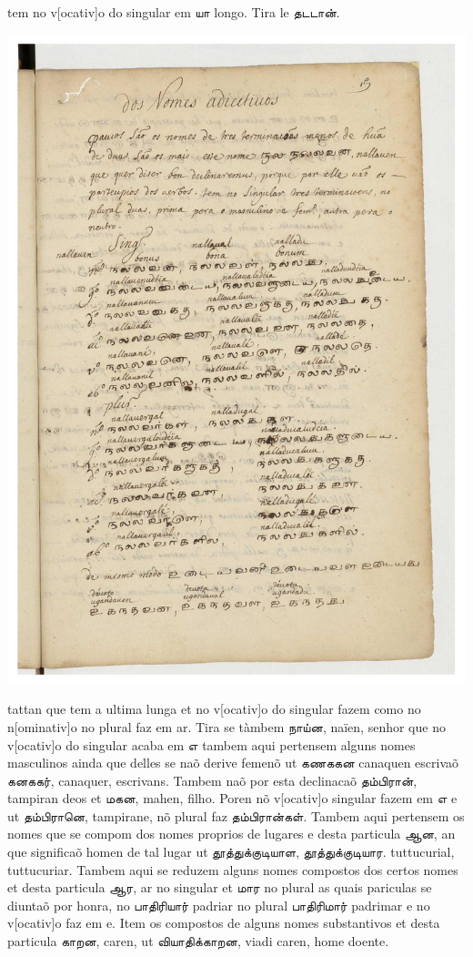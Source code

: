 \documentclass[12pt,a4paper]{scrbook}
\begin{document}
      

 tem no v[ocativ]o do singular em யா longo. Tira le தடடான்.
      
\newpage
\hypertarget{img-39}{
    \includegraphics[width=\textwidth]{img-39}}
\newpage
      

 tattan que tem a ultima lunga et no v[ocativ]o do singular fazem como no
         n[ominativ]o no plural faz em ar. Tira se tàmbem நாய்ன, naïen, senhor que no 
        v[ocativ]o do singular acaba em எ tambem aqui pertensem alguns nomes 
         masculinos ainda que delles se naõ derive femenõ ut கணககன canaquen escrivaõ
        	    கனககர், canaquer, escrivans.
        	     Tambem naõ por esta declinacaõ தம்பிரான், tampiran deos et மகன, mahen, filho.
                Poren nõ v[ocativ]o singular fazem em எ e ut தம்பிரானெ, tampirane, nõ plural faz 
        	   தம்பிரான்கள். 
        	    Tambem aqui pertensem os nomes que se compom dos nomes proprios de lugares e
         desta particula ஆன, an que significaõ homen de tal lugar ut தூத்துக்குடியாள, 
    தூத்துக்குடியார. tuttucurial, tuttucuriar.
Tambem aqui se reduzem alguns nomes compostos dos certos nomes et desta  particula ஆர, ar no singular et மார no plural as quais pariculas se diuntaõ por 
honra, no பாதிரியார் padriar no plural பாதிரிமார் padrimar e no v[ocativ]o faz em e.
Item os compostos de alguns nomes substantivos et desta particula காறன, caren, 
ut வியாதிக்காறன, viadi caren, home doente. 
	
\end{document}
